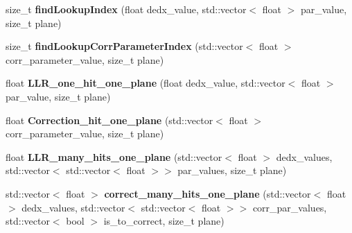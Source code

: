 \begin{DoxyCompactItemize}
\item 
size\+\_\+t {\bfseries find\+Lookup\+Index} (float dedx\+\_\+value, std\+::vector$<$ float $>$ par\+\_\+value, size\+\_\+t plane)\hypertarget{classsearchingfornues_1_1LLRPID_a891182e0af5e60e975e86ea5d2973e11}{}\label{classsearchingfornues_1_1LLRPID_a891182e0af5e60e975e86ea5d2973e11}

\item 
size\+\_\+t {\bfseries find\+Lookup\+Corr\+Parameter\+Index} (std\+::vector$<$ float $>$ corr\+\_\+parameter\+\_\+value, size\+\_\+t plane)\hypertarget{classsearchingfornues_1_1LLRPID_a855edcd3348bff52449abd4b90b42838}{}\label{classsearchingfornues_1_1LLRPID_a855edcd3348bff52449abd4b90b42838}

\item 
float {\bfseries L\+L\+R\+\_\+one\+\_\+hit\+\_\+one\+\_\+plane} (float dedx\+\_\+value, std\+::vector$<$ float $>$ par\+\_\+value, size\+\_\+t plane)\hypertarget{classsearchingfornues_1_1LLRPID_a615612fe3657b51e18bf1e514399363a}{}\label{classsearchingfornues_1_1LLRPID_a615612fe3657b51e18bf1e514399363a}

\item 
float {\bfseries Correction\+\_\+hit\+\_\+one\+\_\+plane} (std\+::vector$<$ float $>$ corr\+\_\+parameter\+\_\+value, size\+\_\+t plane)\hypertarget{classsearchingfornues_1_1LLRPID_a88acddc5e3f931282505f1e1c421d434}{}\label{classsearchingfornues_1_1LLRPID_a88acddc5e3f931282505f1e1c421d434}

\item 
float {\bfseries L\+L\+R\+\_\+many\+\_\+hits\+\_\+one\+\_\+plane} (std\+::vector$<$ float $>$ dedx\+\_\+values, std\+::vector$<$ std\+::vector$<$ float $>$$>$ par\+\_\+values, size\+\_\+t plane)\hypertarget{classsearchingfornues_1_1LLRPID_ac8090da570daccff827fa96685b54f1e}{}\label{classsearchingfornues_1_1LLRPID_ac8090da570daccff827fa96685b54f1e}

\item 
std\+::vector$<$ float $>$ {\bfseries correct\+\_\+many\+\_\+hits\+\_\+one\+\_\+plane} (std\+::vector$<$ float $>$ dedx\+\_\+values, std\+::vector$<$ std\+::vector$<$ float $>$$>$ corr\+\_\+par\+\_\+values, std\+::vector$<$ bool $>$ is\+\_\+to\+\_\+correct, size\+\_\+t plane)\hypertarget{classsearchingfornues_1_1LLRPID_a2ac2b47463117811580f4e52f99bd1b2}{}\label{classsearchingfornues_1_1LLRPID_a2ac2b47463117811580f4e52f99bd1b2}

\end{DoxyCompactItemize}
